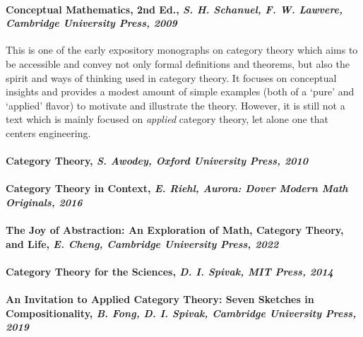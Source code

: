 \documentclass[10pt, article, one side]{memoir}
\begin{document}
    \paragraph{Conceptual Mathematics, 2nd Ed., \emph{S.
            H.
            Schanuel, F.
            W.
            Lawvere, Cambridge University Press, 2009}}

    This is one of the early expository monographs on category theory which aims to be accessible and convey not only formal definitions and theorems, but also the spirit and ways of thinking used in category theory.
    It focuses on conceptual insights and provides a modest amount of simple examples (both of a `pure' and `applied' flavor) to motivate and illustrate the theory.
    However, it is still not a text which is mainly focused on \emph{applied} category theory, let alone one that centers engineering.

    \paragraph{Category Theory, \emph{S.
            Awodey, Oxford University Press, 2010}}

    \paragraph{Category Theory in Context, \emph{E.
            Riehl, Aurora: Dover Modern Math Originals, 2016}}

    \paragraph{The Joy of Abstraction: An Exploration of Math, Category Theory, and Life, \emph{E.
            Cheng, Cambridge University Press, 2022}}

    \paragraph{Category Theory for the Sciences, \emph{D.
            I.
            Spivak, MIT Press, 2014}}

    \paragraph{An Invitation to Applied Category Theory: Seven Sketches in Compositionality, \emph{B.
            Fong, D.
            I.
            Spivak, Cambridge University Press, 2019}
    }
\end{document}
